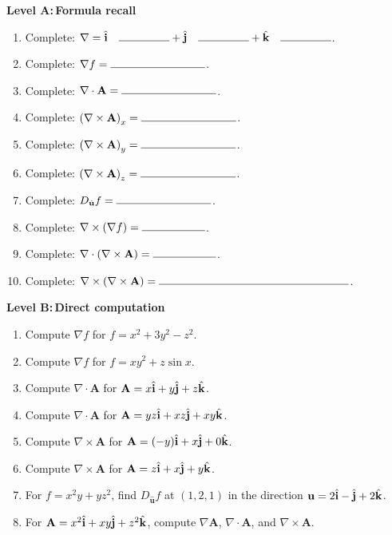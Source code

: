 \documentclass{otscience}
\begin{document}
\begin{practicebox}
    \textbf{Level A:\,Formula recall}
    \begin{enumerate}
        \item Complete: \(\nabla=\ihat\quad\blank[1.6cm]+\jhat\quad\blank[1.6cm]+\khat\quad\blank[1.6cm]\).
        \item Complete: \(\nabla f=\blank[3cm]\).
        \item Complete: \(\nabla\cdot\mathbf{A}=\blank[3cm]\).
        \item Complete: \({(\nabla\times\mathbf{A})}_x=\blank[3cm]\).
        \item Complete: \({(\nabla\times\mathbf{A})}_y=\blank[3cm]\).
        \item Complete: \({(\nabla\times\mathbf{A})}_z=\blank[3cm]\).
        \item Complete: \(D_{\hat{\mathbf{u}}}f=\blank[3cm]\).
        \item Complete: \(\nabla\times(\nabla f)=\blank[2cm]\).
        \item Complete: \(\nabla\cdot(\nabla\times\mathbf{A})=\blank[2cm]\).
        \item Complete: \(\nabla\times(\nabla\times\mathbf{A})=\blank[6cm]\).
    \end{enumerate}

    \textbf{Level B:\,Direct computation}
    \begin{enumerate}
        \item Compute \(\nabla f\) for \(f=x^2+3y^2-z^2\).
        \item Compute \(\nabla f\) for \(f=xy^2+z\sin x\).
        \item Compute \(\nabla\cdot\mathbf{A}\) for \(\mathbf{A}=x\hat{\mathbf{i}}+y\hat{\mathbf{j}}+z\hat{\mathbf{k}}\).
        \item Compute \(\nabla\cdot\mathbf{A}\) for \(\mathbf{A}=yz\hat{\mathbf{i}}+xz\hat{\mathbf{j}}+xy\hat{\mathbf{k}}\).
        \item Compute \(\nabla\times\mathbf{A}\) for \(\mathbf{A}=(-y)\hat{\mathbf{i}}+x\hat{\mathbf{j}}+0\hat{\mathbf{k}}\).
        \item Compute \(\nabla\times\mathbf{A}\) for \(\mathbf{A}=z\hat{\mathbf{i}}+x\hat{\mathbf{j}}+y\hat{\mathbf{k}}\).
        \item For \(f=x^2y+yz^2\), find \(D_{\hat{\mathbf{u}}}f\) at \((1,2,1)\) in the direction \(\mathbf{u}=2\hat{\mathbf{i}}-\hat{\mathbf{j}}+2\hat{\mathbf{k}}\).
        \item For \(\mathbf{A}=x^2\hat{\mathbf{i}}+xy\hat{\mathbf{j}}+z^2\hat{\mathbf{k}}\), compute \(\nabla\mathbf{A}\), \(\nabla\cdot\mathbf{A}\), and \(\nabla\times\mathbf{A}\).
    \end{enumerate}


\end{practicebox}
\end{document}
